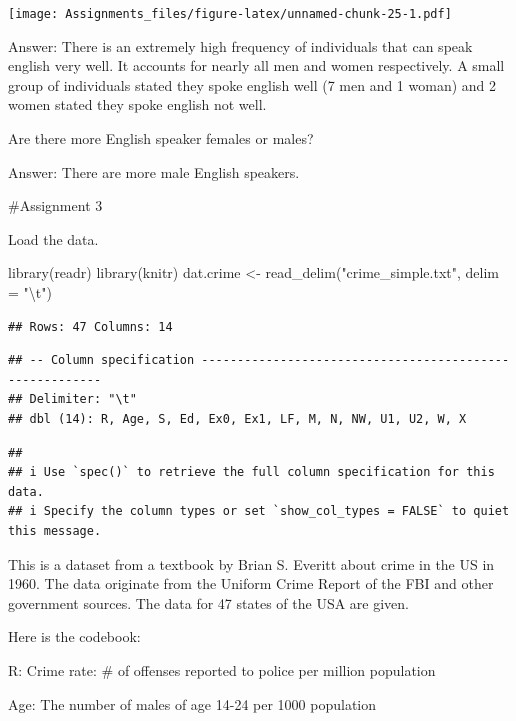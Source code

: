 \documentclass[
]{article}
\newenvironment{Shaded}{\begin{snugshade}}{\end{snugshade}}
\newcommand{\AttributeTok}[1]{\textcolor[rgb]{0.77,0.63,0.00}{#1}}
\newcommand{\FunctionTok}[1]{\textcolor[rgb]{0.00,0.00,0.00}{#1}}
\newcommand{\NormalTok}[1]{#1}
\newcommand{\OtherTok}[1]{\textcolor[rgb]{0.56,0.35,0.01}{#1}}
\newcommand{\SpecialCharTok}[1]{\textcolor[rgb]{0.00,0.00,0.00}{#1}}
\newcommand{\StringTok}[1]{\textcolor[rgb]{0.31,0.60,0.02}{#1}}
\begin{document}
\texttt{[image: Assignments\_files/figure-latex/unnamed-chunk-25-1.pdf]}

Answer: There is an extremely high frequency of individuals that can
speak english very well. It accounts for nearly all men and women
respectively. A small group of individuals stated they spoke english
well (7 men and 1 woman) and 2 women stated they spoke english not well.

Are there more English speaker females or males?

Answer: There are more male English speakers.

\#Assignment 3

Load the data.

\begin{Shaded}
\begin{Highlighting}[]
\FunctionTok{library}\NormalTok{(readr)}
\FunctionTok{library}\NormalTok{(knitr)}
\NormalTok{dat.crime }\OtherTok{\textless{}{-}} \FunctionTok{read\_delim}\NormalTok{(}\StringTok{"crime\_simple.txt"}\NormalTok{, }\AttributeTok{delim =} \StringTok{"}\SpecialCharTok{\textbackslash{}t}\StringTok{"}\NormalTok{)}
\end{Highlighting}
\end{Shaded}

\begin{verbatim}
## Rows: 47 Columns: 14
\end{verbatim}

\begin{verbatim}
## -- Column specification --------------------------------------------------------
## Delimiter: "\t"
## dbl (14): R, Age, S, Ed, Ex0, Ex1, LF, M, N, NW, U1, U2, W, X
\end{verbatim}

\begin{verbatim}
## 
## i Use `spec()` to retrieve the full column specification for this data.
## i Specify the column types or set `show_col_types = FALSE` to quiet this message.
\end{verbatim}

This is a dataset from a textbook by Brian S. Everitt about crime in the
US in 1960. The data originate from the Uniform Crime Report of the FBI
and other government sources. The data for 47 states of the USA are
given.

Here is the codebook:

R: Crime rate: \# of offenses reported to police per million population

Age: The number of males of age 14-24 per 1000 population
\end{document}
